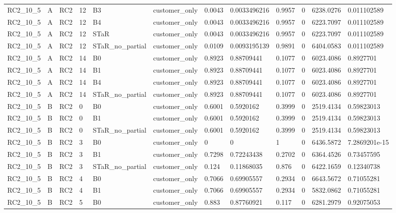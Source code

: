 \begin{longtable}{llllllllllll}
RC2\_10\_5 & A & RC2 & 12 & B3 & customer\_only & 0.0043 & 0.0033496216 & 0.9957 & 0 & 6238.0276 & 0.011102589 \\
RC2\_10\_5 & A & RC2 & 12 & B4 & customer\_only & 0.0043 & 0.0033496216 & 0.9957 & 0 & 6223.7097 & 0.011102589 \\
RC2\_10\_5 & A & RC2 & 12 & STaR & customer\_only & 0.0043 & 0.0033496216 & 0.9957 & 0 & 6223.7097 & 0.011102589 \\
RC2\_10\_5 & A & RC2 & 12 & STaR\_no\_partial & customer\_only & 0.0109 & 0.0093195139 & 0.9891 & 0 & 6404.0583 & 0.011102589 \\
RC2\_10\_5 & A & RC2 & 14 & B0 & customer\_only & 0.8923 & 0.88709441 & 0.1077 & 0 & 6023.4086 & 0.8927701 \\
RC2\_10\_5 & A & RC2 & 14 & B1 & customer\_only & 0.8923 & 0.88709441 & 0.1077 & 0 & 6023.4086 & 0.8927701 \\
RC2\_10\_5 & A & RC2 & 14 & B4 & customer\_only & 0.8923 & 0.88709441 & 0.1077 & 0 & 6023.4086 & 0.8927701 \\
RC2\_10\_5 & A & RC2 & 14 & STaR\_no\_partial & customer\_only & 0.8923 & 0.88709441 & 0.1077 & 0 & 6023.4086 & 0.8927701 \\
RC2\_10\_5 & B & RC2 & 0 & B0 & customer\_only & 0.6001 & 0.5920162 & 0.3999 & 0 & 2519.4134 & 0.59823013 \\
RC2\_10\_5 & B & RC2 & 0 & B1 & customer\_only & 0.6001 & 0.5920162 & 0.3999 & 0 & 2519.4134 & 0.59823013 \\
RC2\_10\_5 & B & RC2 & 0 & STaR\_no\_partial & customer\_only & 0.6001 & 0.5920162 & 0.3999 & 0 & 2519.4134 & 0.59823013 \\
RC2\_10\_5 & B & RC2 & 3 & B0 & customer\_only & 0 & 0 & 1 & 0 & 6436.5872 & 7.2869201e-15 \\
RC2\_10\_5 & B & RC2 & 3 & B1 & customer\_only & 0.7298 & 0.72243438 & 0.2702 & 0 & 6364.4526 & 0.73457595 \\
RC2\_10\_5 & B & RC2 & 3 & STaR\_no\_partial & customer\_only & 0.124 & 0.11868035 & 0.876 & 0 & 6422.1659 & 0.12340738 \\
RC2\_10\_5 & B & RC2 & 4 & B0 & customer\_only & 0.7066 & 0.69905557 & 0.2934 & 0 & 6643.5672 & 0.71055281 \\
RC2\_10\_5 & B & RC2 & 4 & B1 & customer\_only & 0.7066 & 0.69905557 & 0.2934 & 0 & 5832.0862 & 0.71055281 \\
RC2\_10\_5 & B & RC2 & 5 & B0 & customer\_only & 0.883 & 0.87760921 & 0.117 & 0 & 6281.2979 & 0.92075053 \\

\end{longtable}

